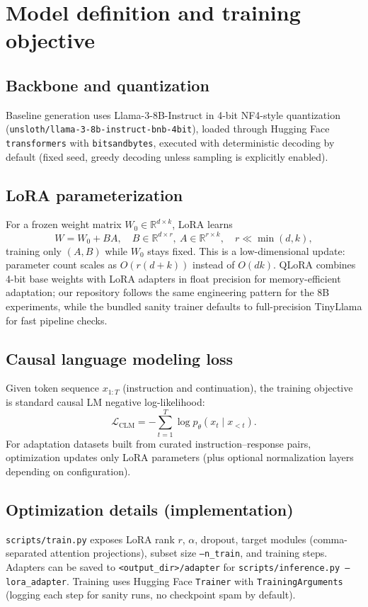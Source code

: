 \documentclass[11pt,a4paper]{article}
\begin{document}
\section{Model definition and training objective}
\subsection{Backbone and quantization}
Baseline generation uses Llama-3-8B-Instruct in 4-bit NF4-style quantization (\texttt{unsloth/llama-3-8b-instruct-bnb-4bit}), loaded through Hugging Face \texttt{transformers} with \texttt{bitsandbytes}, executed with deterministic decoding by default (fixed seed, greedy decoding unless sampling is explicitly enabled).

\subsection{LoRA parameterization}
For a frozen weight matrix $W_0 \in \mathbb{R}^{d \times k}$, LoRA \cite{hu2021lora} learns
\[
W = W_0 + BA,\quad B \in \mathbb{R}^{d \times r},\ A \in \mathbb{R}^{r \times k},\quad r \ll \min(d,k),
\]
training only $(A,B)$ while $W_0$ stays fixed. This is a low-dimensional update: parameter count scales as $O(r(d+k))$ instead of $O(dk)$. QLoRA \cite{dettmers2023qlora} combines 4-bit base weights with LoRA adapters in float precision for memory-efficient adaptation; our repository follows the same engineering pattern for the 8B experiments, while the bundled sanity trainer defaults to full-precision TinyLlama for fast pipeline checks.

\subsection{Causal language modeling loss}
Given token sequence $x_{1:T}$ (instruction and continuation), the training objective is standard causal LM negative log-likelihood:
\[
\mathcal{L}_{\mathrm{CLM}} = -\sum_{t=1}^{T} \log p_\theta(x_t \mid x_{<t}).
\]
For adaptation datasets built from curated instruction--response pairs, optimization updates only LoRA parameters (plus optional normalization layers depending on configuration).

\subsection{Optimization details (implementation)}
\texttt{scripts/train.py} exposes LoRA rank $r$, $\alpha$, dropout, target modules (comma-separated attention projections), subset size \texttt{--n\_train}, and training steps. Adapters can be saved to \texttt{<output\_dir>/adapter} for \texttt{scripts/inference.py --lora\_adapter}. Training uses Hugging Face \texttt{Trainer} with \texttt{TrainingArguments} (logging each step for sanity runs, no checkpoint spam by default).
\end{document}
